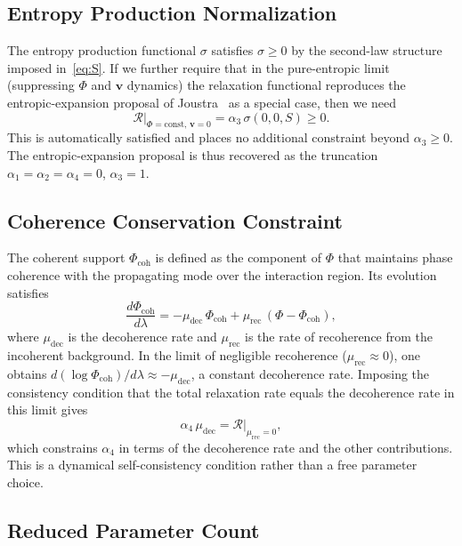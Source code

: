\documentclass[12pt,a4paper]{article}
\theoremstyle{remark}
\newcommand{\vv}{\mathbf{v}}
\newcommand{\Rcal}{\mathcal{R}}
\begin{document}
\subsection{Entropy Production Normalization}

The entropy production functional $\sigma$ satisfies $\sigma \ge 0$ by the
second-law structure imposed in~\eqref{eq:S}. If we further require that in
the pure-entropic limit (suppressing $\Phi$ and $\vv$ dynamics) the relaxation
functional reproduces the entropic-expansion proposal of Joustra~\cite{joustra}
as a special case, then we need
\begin{equation}
\Rcal\big|_{\Phi=\mathrm{const},\,\vv=0} = \alpha_3\,\sigma(0,0,S) \ge 0.
\end{equation}
This is automatically satisfied and places no additional constraint beyond
$\alpha_3 \ge 0$. The entropic-expansion proposal is thus recovered as the
truncation $\alpha_1 = \alpha_2 = \alpha_4 = 0$, $\alpha_3 = 1$.

\subsection{Coherence Conservation Constraint}

The coherent support $\Phi_{\mathrm{coh}}$ is defined as the component of $\Phi$
that maintains phase coherence with the propagating mode over the interaction
region. Its evolution satisfies
\begin{equation}
\frac{d\Phi_{\mathrm{coh}}}{d\lambda} = -\mu_{\mathrm{dec}}\,\Phi_{\mathrm{coh}} + \mu_{\mathrm{rec}}\,(\Phi - \Phi_{\mathrm{coh}}),
\end{equation}
where $\mu_{\mathrm{dec}}$ is the decoherence rate and $\mu_{\mathrm{rec}}$ is
the rate of recoherence from the incoherent background. In the limit of
negligible recoherence ($\mu_{\mathrm{rec}} \approx 0$), one obtains
$d(\log\Phi_{\mathrm{coh}})/d\lambda \approx -\mu_{\mathrm{dec}}$, a constant
decoherence rate. Imposing the consistency condition that the total relaxation
rate equals the decoherence rate in this limit gives
\begin{equation}
\alpha_4\,\mu_{\mathrm{dec}} = \Rcal\big|_{\mu_{\mathrm{rec}}=0},
\end{equation}
which constrains $\alpha_4$ in terms of the decoherence rate and the other
contributions. This is a dynamical self-consistency condition rather than a
free parameter choice.

\subsection{Reduced Parameter Count}
\end{document}
